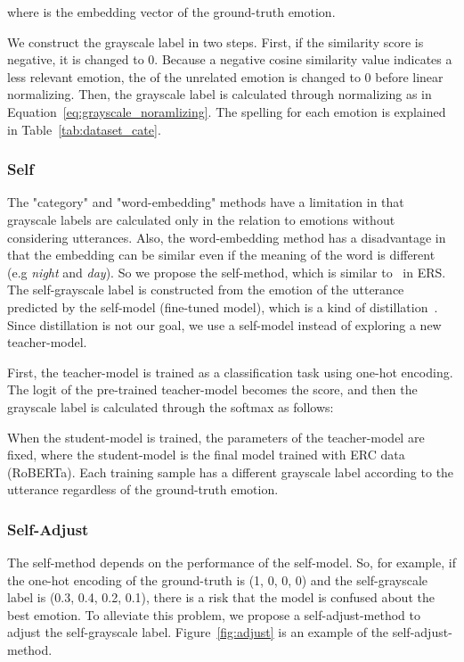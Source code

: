 \documentclass[a4paper]{article}
\begin{document}
where  is the embedding vector of the ground-truth emotion. 


We construct the grayscale label  in two steps. First, if the similarity score is negative, it is changed to 0. Because a negative cosine similarity value indicates a less relevant emotion, the  of the unrelated emotion is changed to 0 before linear normalizing. Then, the grayscale label is calculated through normalizing as in Equation~\ref{eq:grayscale_noramlizing}. The spelling for each emotion is explained in Table~\ref{tab:dataset_cate}.





\subsubsection{Self}
The "category" and "word-embedding" methods have a limitation in that grayscale labels are calculated only in the relation to emotions without considering utterances. Also, the word-embedding method has a disadvantage in that the embedding can be similar even if the meaning of the word is different (e.g \textit{night} and \textit{day}). So we propose the self-method, which is similar to~\cite{Guo_Han_Han_Huang_Lu_2021} in ERS. The self-grayscale label is constructed from the emotion of the utterance predicted by the self-model (fine-tuned model), which is a kind of distillation~\cite{Gou2021}. Since distillation is not our goal, we use a self-model instead of exploring a new teacher-model. 


First, the teacher-model is trained as a classification task using one-hot encoding. The logit of the pre-trained teacher-model becomes the score, and then the grayscale label is calculated through the softmax as follows:




When the student-model is trained, the parameters of the teacher-model are fixed, where the student-model is the final model trained with ERC data (RoBERTa). Each training sample has a different grayscale label according to the utterance regardless of the ground-truth emotion.


\subsubsection{Self-Adjust}
The self-method depends on the performance of the self-model. So, for example, if the one-hot encoding of the ground-truth is (1, 0, 0, 0) and the self-grayscale label is (0.3, 0.4, 0.2, 0.1), there is a risk that the model is confused about the best emotion. To alleviate this problem, we propose a self-adjust-method to adjust the self-grayscale label. Figure~\ref{fig:adjust} is an example of the self-adjust-method.
\end{document}
